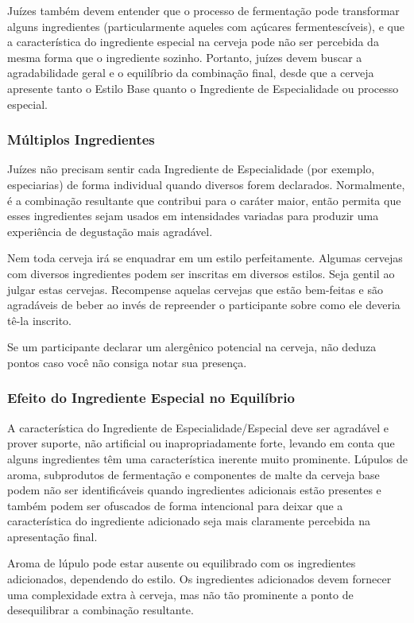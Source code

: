 Juízes também devem entender que o processo de fermentação pode transformar alguns ingredientes (particularmente aqueles com açúcares fermentescíveis), e que a característica do ingrediente especial na cerveja pode não ser percebida da mesma forma que o ingrediente sozinho. Portanto, juízes devem buscar a agradabilidade geral e o equilíbrio da combinação final, desde que a cerveja apresente tanto o Estilo Base quanto o Ingrediente de Especialidade ou processo especial.

\subsubsection*{Múltiplos Ingredientes}
Juízes não precisam sentir cada Ingrediente de Especialidade (por exemplo, especiarias) de forma individual quando diversos forem declarados. Normalmente, é a combinação resultante que contribui para o caráter maior, então permita que esses ingredientes sejam usados em intensidades variadas para produzir uma experiência de degustação mais agradável.

Nem toda cerveja irá se enquadrar em um estilo perfeitamente. Algumas cervejas com diversos ingredientes podem ser inscritas em diversos estilos. Seja gentil ao julgar estas cervejas. Recompense aquelas cervejas que estão bem-feitas e são agradáveis de beber ao invés de repreender o participante sobre como ele deveria tê-la inscrito.

Se um participante declarar um alergênico potencial na cerveja, não deduza pontos caso você não consiga notar sua presença.

\subsubsection*{Efeito do Ingrediente Especial no Equilíbrio}
A característica do Ingrediente de Especialidade/Especial deve ser agradável e prover suporte, não artificial ou inapropriadamente forte, levando em conta que alguns ingredientes têm uma característica inerente muito prominente. Lúpulos de aroma, subprodutos de fermentação e componentes de malte da cerveja base podem não ser identificáveis quando ingredientes adicionais estão presentes e também podem ser ofuscados de forma intencional para deixar que a característica do ingrediente adicionado seja mais claramente percebida na apresentação final.

Aroma de lúpulo pode estar ausente ou equilibrado com os ingredientes adicionados, dependendo do estilo. Os ingredientes adicionados devem fornecer uma complexidade extra à cerveja, mas não tão prominente a ponto de desequilibrar a combinação resultante.
